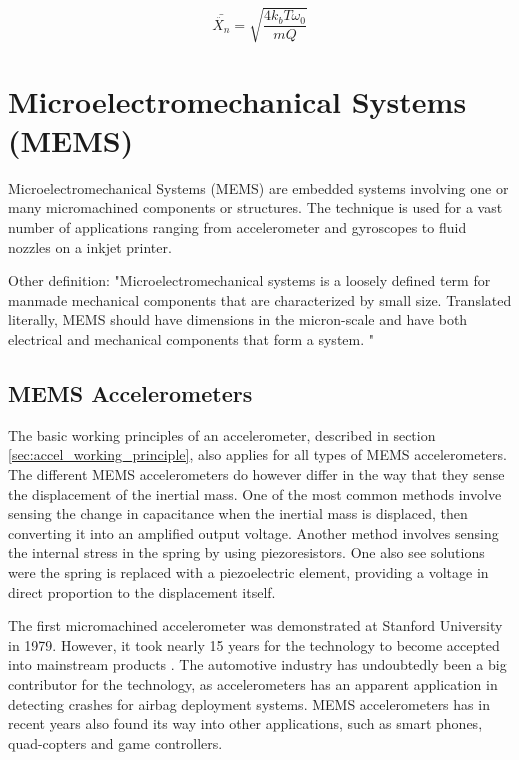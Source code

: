 \begin{equation}
\bar{\ddot{X_n}} = \sqrt{\frac{4 k_b T \omega_0}{mQ}}
\label{eq:noise_spectral_density}
\end{equation}

\section{Microelectromechanical Systems (MEMS)}

Microelectromechanical Systems (MEMS) are embedded systems involving one or many micromachined components or structures\cite[p.~3]{maluf04}. The technique is used for a vast number of applications ranging from accelerometer and gyroscopes to fluid nozzles on a inkjet printer.

Other definition: "Microelectromechanical systems is a loosely defined term for manmade mechanical components that are characterized by small size. Translated literally, MEMS should have dimensions in the micron-scale and have both electrical and mechanical components that form a system. "

\subsection{MEMS Accelerometers}

The basic working principles of an accelerometer, described in section \ref{sec:accel_working_principle}, also applies for all types of MEMS accelerometers. The different MEMS accelerometers do however differ in the way that they sense the displacement of the inertial mass. One of the most common methods involve sensing the change in capacitance when the inertial mass is displaced, then converting it into an amplified output voltage. Another method involves sensing the internal stress in the spring by using piezoresistors. One also see solutions were the spring is replaced with a piezoelectric element, providing a voltage in direct proportion to the displacement itself.

The first micromachined accelerometer was demonstrated at Stanford University in 1979. However, it took nearly 15 years for the technology to become accepted into mainstream products \cite[p.~8]{maluf04}. The automotive industry has undoubtedly been a big contributor for the technology, as accelerometers has an apparent application in detecting crashes for airbag deployment systems. MEMS accelerometers has in recent years also found its way into other applications, such as smart phones, quad-copters and game controllers. 

